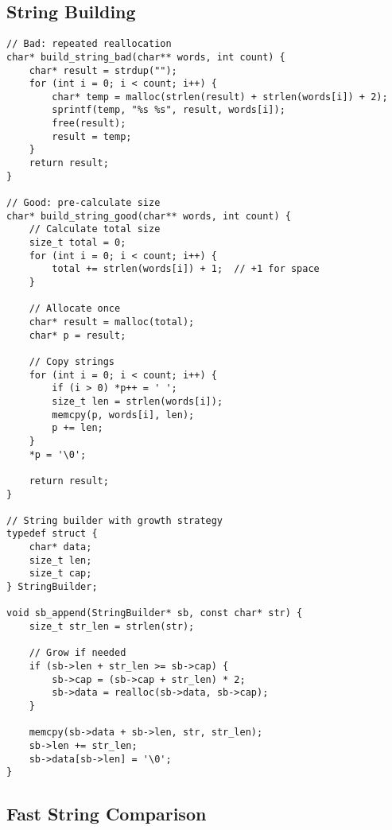 \subsection{String Building}

\begin{lstlisting}
// Bad: repeated reallocation
char* build_string_bad(char** words, int count) {
    char* result = strdup("");
    for (int i = 0; i < count; i++) {
        char* temp = malloc(strlen(result) + strlen(words[i]) + 2);
        sprintf(temp, "%s %s", result, words[i]);
        free(result);
        result = temp;
    }
    return result;
}

// Good: pre-calculate size
char* build_string_good(char** words, int count) {
    // Calculate total size
    size_t total = 0;
    for (int i = 0; i < count; i++) {
        total += strlen(words[i]) + 1;  // +1 for space
    }

    // Allocate once
    char* result = malloc(total);
    char* p = result;

    // Copy strings
    for (int i = 0; i < count; i++) {
        if (i > 0) *p++ = ' ';
        size_t len = strlen(words[i]);
        memcpy(p, words[i], len);
        p += len;
    }
    *p = '\0';

    return result;
}

// String builder with growth strategy
typedef struct {
    char* data;
    size_t len;
    size_t cap;
} StringBuilder;

void sb_append(StringBuilder* sb, const char* str) {
    size_t str_len = strlen(str);

    // Grow if needed
    if (sb->len + str_len >= sb->cap) {
        sb->cap = (sb->cap + str_len) * 2;
        sb->data = realloc(sb->data, sb->cap);
    }

    memcpy(sb->data + sb->len, str, str_len);
    sb->len += str_len;
    sb->data[sb->len] = '\0';
}
\end{lstlisting}

\subsection{Fast String Comparison}

